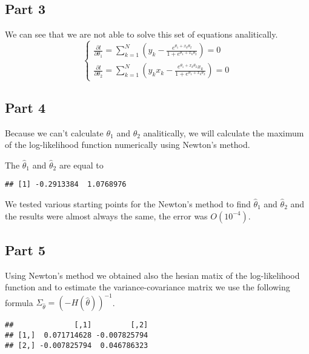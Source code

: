 \documentclass[12pt, a4paper]{article}\usepackage[]{graphicx}\usepackage[]{color}
\makeatletter
\newenvironment{kframe}{%
 \def\at@end@of@kframe{}%
 \ifinner\ifhmode%
  \def\at@end@of@kframe{\end{minipage}}%
  \begin{minipage}{\columnwidth}%
 \fi\fi%
 \def\FrameCommand##1{\hskip\@totalleftmargin \hskip-\fboxsep
 \colorbox{shadecolor}{##1}\hskip-\fboxsep
     \hskip-\linewidth \hskip-\@totalleftmargin \hskip\columnwidth}%
 \MakeFramed {\advance\hsize-\width
   \@totalleftmargin\z@ \linewidth\hsize
   \@setminipage}}%
 {\par\unskip\endMakeFramed%
 \at@end@of@kframe}
\newenvironment{knitrout}{}{} %
\makeatother
\begin{document}
\subsection{Part 3}
We can see that we are not able to solve this set of equations analitically.
\[ \begin{cases}
\frac{\partial l}{\partial\theta_{1}}=\sum_{k=1}^{N}\left(y_{k}-\frac{e^{\theta_{1}+x_{k}\theta_{2}}}{1+e^{\theta_{1}+x_{k}\theta_{2}}}\right)=0 \\
\frac{\partial l}{\partial\theta_{2}}=\sum_{k=1}^{N}\left(y_{k}x_{k}-\frac{e^{\theta_{1}+x_{k}\theta_{2}}x_{k}}{1+e^{\theta_{1}+x_{k}\theta_{2}}}\right)=0
\end{cases} \]



\subsection{Part 4}
Because we can't calculate $\theta_1$ and $\theta_2$ analitically, we will calculate the maximum of the log-likelihood function numerically using Newton's method.

The $\hat{\theta}_1$ and $\hat{\theta}_2$ are equal to
\begin{knitrout}
\color{fgcolor}\begin{kframe}
\begin{verbatim}
## [1] -0.2913384  1.0768976
\end{verbatim}
\end{kframe}
\end{knitrout}
We tested various starting points for the Newton's method to find $\hat{\theta}_1$ and $\hat{\theta}_2$ and the results were almost always the same, the error was $O(10^{-4})$.


\subsection{Part 5}
Using Newton's method we obtained also the hesian matix of the log-likelihood function and to estimate the variance-covariance matrix we use the following formula
$ \Sigma_{\hat{\theta}} = (-H(\hat{\theta}))^{-1}$.

\begin{knitrout}
\color{fgcolor}\begin{kframe}
\begin{verbatim}
##              [,1]         [,2]
## [1,]  0.071714628 -0.007825794
## [2,] -0.007825794  0.046786323
\end{verbatim}
\end{kframe}
\end{knitrout}
\end{document}
